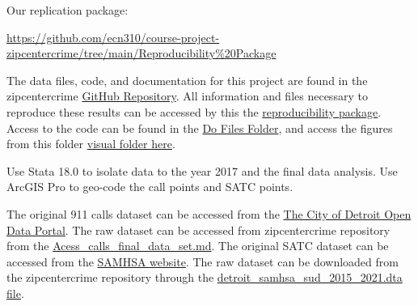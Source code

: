 \documentclass[12pt]{article}
\begin{document}
Our replication package:

\href{https://github.com/ecn310/course-project-zipcentercrime/tree/main/Reproducibility%20Package}{https://github.com/ecn310/course-project-zipcentercrime/tree/main/Reproducibility\%20Package}

\vspace{10pt}


The data files, code, and documentation for this project are found in the zipcentercrime \href{https://github.com/ecn310/course-project-zipcentercrime}{GitHub Repository}. All information and files necessary to reproduce these results can be accessed by this the \href{https://github.com/ecn310/course-project-zipcentercrime/tree/main/Reproducibility%20Package}{reproducibility package}. Access to the code can be found in the \href{https://github.com/ecn310/course-project-zipcentercrime/tree/main/Reproducibility%20Package/Do%20files}{Do Files Folder}, and access the figures from this folder \href{https://github.com/ecn310/course-project-zipcentercrime/tree/main/Reproducibility%20Package/Visual%20Graphics}{visual folder here}. 

Use Stata 18.0 to isolate data to the year 2017 and the final data analysis. Use ArcGIS Pro to geo-code the call points and SATC points. 

The original 911 calls dataset can be accessed from the \href{https://data.detroitmi.gov}{The City of Detroit Open Data Portal}. The raw dataset can be accessed from zipcentercrime repository from the \href{https://github.com/ecn310/course-project-zipcentercrime/blob/main/Reproducibility%20Package/RawData/Acess_calls_final_data_set.md}{Acess\_calls\_final\_data\_set.md}. The original SATC dataset can be accessed from the \href{https://www.samhsa.gov}{SAMHSA website}. The raw dataset can be downloaded from the zipcentercrime repository through the \href{https://github.com/ecn310/course-project-zipcentercrime/blob/main/Reproducibility%20Package/RawData/detroit_samhsa_sud_2015_2021.dta}{detroit\_samhsa\_sud\_2015\_2021.dta file}.

\end{document}
